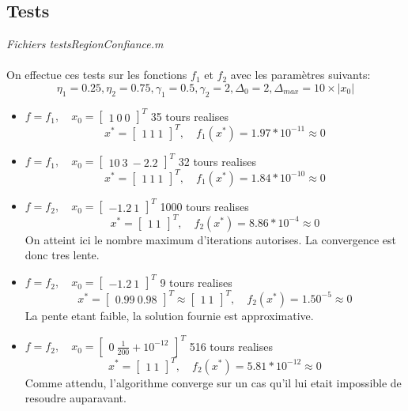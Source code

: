 \documentclass[12pt]{article}
\begin{document}
\subsection{Tests}
\begin{flushright}
\textit{Fichiers testsRegionConfiance.m}
\end{flushright}
\paragraph{}
On effectue ces tests sur les fonctions $f_1$ et $f_2$ avec les paramètres suivants:
	\[\eta_1 = 0.25, \eta_2 = 0.75, \gamma_1 = 0.5, \gamma_2 = 2, \Delta_0 = 2, \Delta_{max} = 10\times|x_0|\]
\begin{itemize}
	\item $f=f_1,\quad x_0 = \left[\begin{array}{c}1\ 0\ 0\end{array}\right]^T$ 35 tours realises
			\[x^* = \left[\begin{array}{c}1\ 1\ 1\end{array}\right]^T,\quad f_1(x^*) = 1.97*10^{-11} \approx 0\]
	\item $f=f_1,\quad x_0 = \left[\begin{array}{c}10\ 3\ -2.2\end{array}\right]^T$ 32 tours realises
			\[x^* = \left[\begin{array}{c}1\ 1\ 1\end{array}\right]^T,\quad f_1(x^*) = 1.84*10^{-10} \approx 0\]
	\item $f=f_2,\quad x_0 = \left[\begin{array}{c}-1.2\ 1\end{array}\right]^T$ 1000 tours realises
			\[x^* = \left[\begin{array}{c}1\ 1\end{array}\right]^T,\quad f_2(x^*) = 8.86*10^{-4} \approx 0\]
			On atteint ici le nombre maximum d'iterations autorises. La convergence est donc tres lente.
	\item $f=f_2,\quad x_0 = \left[\begin{array}{c}-1.2\ 1\end{array}\right]^T$ 9 tours realises
			\[x^* = \left[\begin{array}{c}0.99\ 0.98\end{array}\right]^T \approx \left[\begin{array}{c}1\ 1\end{array}\right]^T,\quad f_2(x^*) = 1.50^{-5} \approx 0\]
		La pente etant faible, la solution fournie est approximative.
	\item $f=f_2,\quad x_0 = \left[\begin{array}{c}0\ \frac{1}{200} + 10^{-12}\end{array}\right]^T$ 516 tours realises
			\[x^* = \left[\begin{array}{c}1\ 1\end{array}\right]^T,\quad f_2(x^*) = 5.81*10^{-12} \approx 0\]
			Comme attendu, l'algorithme converge sur un cas qu'il lui etait impossible de resoudre auparavant.
\end{itemize}
\end{document}
